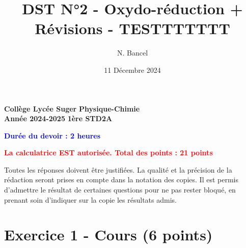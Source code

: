 \documentclass[answers]{exam}
\title{DST N°2 - Oxydo-réduction + Révisions - TESTTTTTTT}
\author{N. Bancel}
\date{11 Décembre 2024}
\begin{document}
\textbf{Collège Lycée Suger}
\hfill
\textbf{Physique-Chimie} \\

\textbf{Année 2024-2025}
\hfill
\textbf{1ère STD2A} \par

{\let\newpage\relax\maketitle}


\begin{center}
  \textbf{\textcolor{blue}{Durée du devoir : 2 heures}} \par
  \vspace{1em}
  \textbf{\textcolor{red}{La calculatrice EST autorisée. Total des points : 21 points}} \par
  \vspace{1em}
\end{center}

\begin{tcolorbox}[colback=gray!10!white, colframe=gray, title=Note importante]
  \itshape{Toutes les réponses doivent être justifiées.
  La qualité et la précision de la rédaction seront prises en compte dans la notation des copies.
  Il est permis d'admettre le résultat de certaines questions pour ne pas rester bloqué, en prenant soin d'indiquer sur la copie les résultats admis. \par
  }
\end{tcolorbox}

\section*{Exercice 1 - Cours (6 points)}
\end{document}
